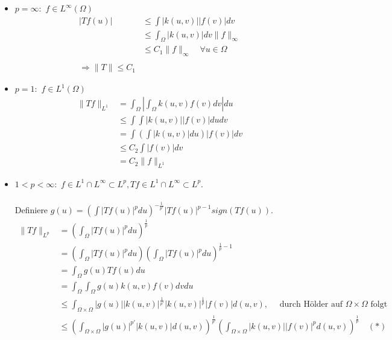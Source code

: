 \begin{beweis}
	\begin{itemize}
		\item $p = \infty:$ $f \in L^{\infty}(\Omega)$
			\begin{align*}
				|T f(u)| & \leq \int |k(u, v)| |f(v)| dv \\
						 & \leq \int_{\Omega} |k(u, v)| dv \|f\|_{\infty} \\
						 & \leq C_{1} \| f \|_{\infty} \quad \forall u \in \Omega \\ \\
				\Rightarrow \| T \| \leq C_{1}
			\end{align*}
			
		\item $p = 1:$  $f \in L^{1}(\Omega)$
			\begin{align*}
				\| T f \|_{L^{1}} & = \int_{\Omega} \left| \int_{\Omega} k(u, v) f(v) dv \right| du \\
				& \leq \int \int |k(u, v)| |f(v)| du dv \\
				& = \int \left( \int |k(u, v)| du \right) |f(v)| dv \\
				& \leq C_{2} \int |f(v)| dv \\
				& = C_{2} \| f \|_{L^{1}}
			\end{align*}
		\item $1 < p < \infty:$	$f \in L^{1} \cap L^{\infty} \subset L^{p}, T f \in L^{1} \cap L^{\infty} \subset L^{p}$. \\ \\
			Definiere $g(u) = \left( \int |Tf(u)|^{p} du \right)^{- \frac{1}{p'}} \left| T f(u) \right|^{p - 1} sign( T f(u) )$.
			\begin{align*}
				\| T f \|_{L^{p}} & = \left( \int_{\Omega} | T f(u) |^{p} du \right)^{\frac{1}{p}} \\
								  & = \left( \int_{\Omega} | T f(u) |^{p} du \right) \left( \int_{\Omega} | T f(u) |^{p} du \right)^{\frac{1}{p} - 1} \\
								  & = \int_{\Omega} g(u) Tf(u) du \\
								  & = \int_{\Omega} \int_{\Omega} g(u) k(u, v) f(v) dv du \\
								  & \leq \int_{\Omega \times \Omega} | g(u) | | k(u, v) |^{\frac{1}{p'}} |k(u, v) |^{\frac{1}{p}} |f(v)| d(u, v), \quad \text{ durch Hölder auf } \Omega \times \Omega \text{ folgt} \\
								  & \leq \left( \int_{\Omega \times \Omega} | g(u) |^{p'} |k(u, v)| d(u, v) \right)^{\frac{1}{p'}} \left( \int_{\Omega \times \Omega} |k(u, v)| |f(v)|^{p} d(u, v) \right)^{\frac{1}{p}} \quad (*)

\end{align*}
\end{itemize}
\end{beweis}
